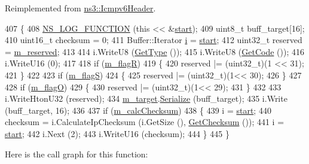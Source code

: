 Reimplemented from \hyperlink{classns3_1_1Icmpv6Header_a730861c09bbcc03f586a7b31656cbbc5}{ns3\+::\+Icmpv6\+Header}.


\begin{DoxyCode}
407 \{
408   \hyperlink{log-macros-disabled_8h_a90b90d5bad1f39cb1b64923ea94c0761}{NS\_LOG\_FUNCTION} (\textcolor{keyword}{this} << &\hyperlink{namespacevisualizer_1_1core_a2a35e5d8a34af358b508dac8635754e0}{start});
409   uint8\_t buff\_target[16];
410   uint16\_t checksum = 0;
411   Buffer::Iterator \hyperlink{bernuolliDistribution_8m_a6f6ccfcf58b31cb6412107d9d5281426}{i} = \hyperlink{namespacevisualizer_1_1core_a2a35e5d8a34af358b508dac8635754e0}{start};
412   uint32\_t reserved = \hyperlink{classns3_1_1Icmpv6NA_a2ae5c4f93f08343b1bd1bf12879ad39b}{m\_reserved};
413 
414   i.WriteU8 (\hyperlink{classns3_1_1Icmpv6Header_a739eb76b792c840e9729110cb9d3ba1d}{GetType} ());
415   i.WriteU8 (\hyperlink{classns3_1_1Icmpv6Header_a0a66ddd5032075acb43d43677c343496}{GetCode} ());
416   i.WriteU16 (0);
417 
418   \textcolor{keywordflow}{if} (\hyperlink{classns3_1_1Icmpv6NA_aba3ddf05ea11b9194bb0484299b91641}{m\_flagR})
419     \{
420       reserved |= (uint32\_t)(1 << 31);
421     \}
422 
423   \textcolor{keywordflow}{if} (\hyperlink{classns3_1_1Icmpv6NA_a1d117fa8aa4cb770bfc887bbf06e1b43}{m\_flagS})
424     \{
425       reserved |= (uint32\_t)(1<< 30);
426     \}
427 
428   \textcolor{keywordflow}{if} (\hyperlink{classns3_1_1Icmpv6NA_af69a1b4d2babd021e6d6121cea6ea853}{m\_flagO})
429     \{
430       reserved |= (uint32\_t)(1<< 29);
431     \}
432 
433   i.WriteHtonU32 (reserved);
434   \hyperlink{classns3_1_1Icmpv6NA_ad37f044bb91453c07425db84e6bcedb6}{m\_target}.\hyperlink{classns3_1_1Ipv6Address_adf5b453892de2893a371380ab299db88}{Serialize} (buff\_target);
435   i.Write (buff\_target, 16);
436 
437   \textcolor{keywordflow}{if} (\hyperlink{classns3_1_1Icmpv6Header_afdfd2dc6e28e0504e02c741d9585ccf9}{m\_calcChecksum})
438     \{
439       i = \hyperlink{namespacevisualizer_1_1core_a2a35e5d8a34af358b508dac8635754e0}{start};
440       checksum = i.CalculateIpChecksum (i.GetSize (), \hyperlink{classns3_1_1Icmpv6Header_a94c5bd0503cfd705ff2c93eb57fd1a75}{GetChecksum} ());
441       i = \hyperlink{namespacevisualizer_1_1core_a2a35e5d8a34af358b508dac8635754e0}{start};
442       i.Next (2);
443       i.WriteU16 (checksum);
444     \}
445 \}
\end{DoxyCode}


Here is the call graph for this function\+:


